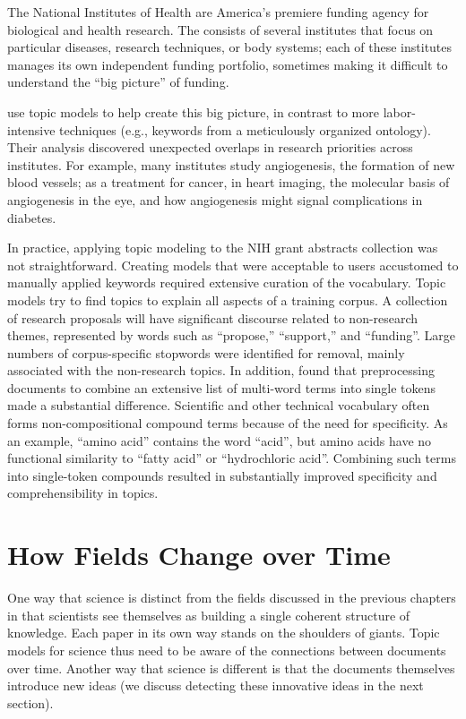 The National Institutes of Health are America's premiere funding
agency for biological and health research.  The  consists of
several institutes that focus on particular diseases, research techniques, or body
systems; each of these institutes manages its own independent funding portfolio,
sometimes making it difficult to understand the ``big picture'' of funding.

\citet{talley-11} use topic models to help create this big picture,
in contrast to more labor-intensive techniques (e.g., keywords from a
meticulously organized ontology).  Their analysis discovered
unexpected overlaps in research priorities across institutes.  For
example, many institutes study angiogenesis, the formation of new
blood vessels; as a treatment for cancer, in heart imaging, the
molecular basis of angiogenesis in the eye, and how angiogenesis might
signal complications in diabetes.

In practice, applying topic modeling to the NIH grant abstracts collection was not straightforward.
Creating models that were acceptable to users accustomed to manually applied keywords required extensive curation of the vocabulary.
Topic models try to find topics to explain all aspects of a training corpus.
A collection of research proposals will have significant discourse related to non-research themes, represented by words such as ``propose,'' ``support,'' and ``funding''.
Large numbers of corpus-specific stopwords were identified for removal, mainly associated with the non-research topics.
In addition, \citet{talley-11} found that preprocessing documents to combine an extensive list of multi-word terms into single tokens made a substantial difference.
Scientific and other technical vocabulary often forms non-compositional compound terms because of the need for specificity.
As an example, ``amino acid'' contains the word ``acid'', but amino acids have no functional similarity to ``fatty acid'' or ``hydrochloric acid''.
Combining such terms into single-token compounds resulted in substantially improved specificity and comprehensibility in topics.

\section{How Fields Change over Time}
\label{sec:sci_change}

One way that science is distinct from the fields discussed in the
previous chapters in that scientists see themselves as building a single coherent structure of knowledge.  Each
paper in its own way stands on the shoulders of giants. Topic models
for science thus need to be aware of the connections between documents
over time.  Another way that science is different is that the
documents themselves introduce new ideas (we discuss detecting these
innovative ideas in the next section).


